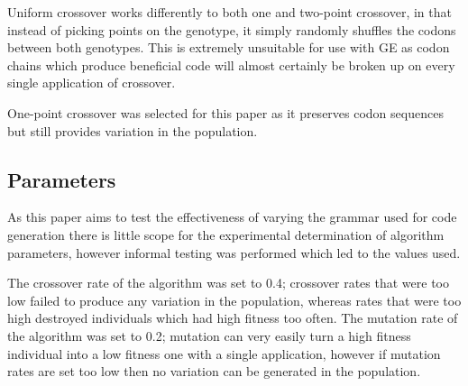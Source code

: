 \documentclass[a4paper, 12pt]{article}
\begin{document}
Uniform crossover works differently to both one and two-point crossover, in that instead of picking points on the genotype, it simply randomly shuffles the codons between both genotypes. This is extremely unsuitable for use with GE as codon chains which produce beneficial code will almost certainly be broken up on every single application of crossover. 

One-point crossover was selected for this paper as it preserves codon sequences but still provides variation in the population.


\subsection{Parameters}
As this paper aims to test the effectiveness of varying the grammar used for code generation there is little scope for the experimental determination of algorithm parameters, however informal testing was performed which led to the values used.

The crossover rate of the algorithm was set to 0.4; crossover rates that were too low failed to produce any variation in the population, whereas rates that were too high destroyed individuals which had high fitness too often. The mutation rate of the algorithm was set to 0.2; mutation can very easily turn a high fitness individual into a low fitness one with a single application, however if mutation rates are set too low then no variation can be generated in the population.
\end{document}
